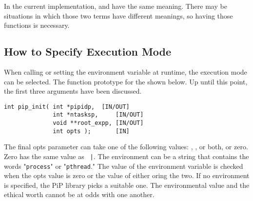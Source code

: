 In the current implementation,  and
 have the same meaning. There may be
situations in which those two terms have different meanings, so having
those functions is necessary. 

\subsection{How to Specify Execution Mode}

When calling  or setting the 
environment variable at runtime, the execution mode can be
selected. The function prototype 
for the  shown below. Up until this point, the first
three arguments have been discussed.

\begin{lstlisting}[frame=tRBl]
int pip_init( int *pipidp,	[IN/OUT]
              int *ntasksp,     [IN/OUT]
              void **root_expp, [IN/OUT]
              int opts );       [IN]
\end{lstlisting}

The final opts parameter can take one of the following values:
, , or both, or
zero. Zero has the same value as {\tt
  |}. The
 environment can be a string that contains the words
"{\tt process}" or "{\tt pthread}." The value of the 
environment variable is checked when the opts value is zero or the
value of either oring the two. If no environment is specified, the PiP
library picks a suitable one. The environmental value and the ethical
worth cannot be at odds with one another. 


